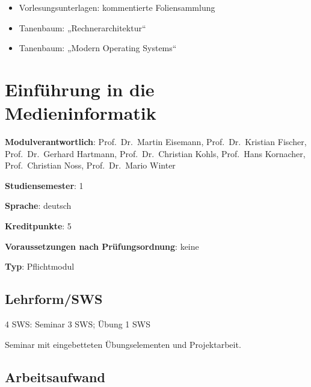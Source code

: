 \begin{itemize}
\tightlist
\item
  Vorlesungsunterlagen: kommentierte Foliensammlung
\item
  Tanenbaum: „Rechnerarchitektur``
\item
  Tanenbaum: „Modern Operating Systems``
\end{itemize}

\chapter{Einführung in die
Medieninformatik\label{/mi-2017/modulbeschreibungen-bachelor/BA_EinfhrungindieMedieninformatik}}\label{einfuxfchrung-in-die-medieninformatikpathlabelmi-2017modulbeschreibungen-bachelorbaux5feinfhrungindiemedieninformatik}

\begin{modulHead}
\textbf{Modulverantwortlich}: Prof.~Dr.~Martin
Eisemann, Prof.~Dr.~Kristian Fischer, Prof.~Dr.~Gerhard Hartmann,
Prof.~Dr.~Christian Kohls, Prof.~Hans Kornacher, Prof.~Christian Noss,
Prof.~Dr.~Mario
Winter
\end{modulHead}
\begin{modulHead}
\textbf{Studiensemester}:
1
\end{modulHead}
\begin{modulHead}
\textbf{Sprache}:
deutsch
\end{modulHead}
\begin{modulHead}
\textbf{Kreditpunkte}:
5
\end{modulHead}
\begin{modulHead}
\textbf{Voraussetzungen nach
Prüfungsordnung}: keine
\end{modulHead}
\begin{modulHead}
\textbf{Typ}:
Pflichtmodul
\end{modulHead}


\section*{Lehrform/SWS\label{/mi-2017/modulbeschreibungen-bachelor/BA_EinfhrungindieMedieninformatik}}\label{lehrformswspathlabelmi-2017modulbeschreibungen-bachelorbaux5feinfhrungindiemedieninformatik}

4 SWS: Seminar 3 SWS; Übung 1 SWS

Seminar mit eingebetteten Übungselementen und Projektarbeit.

\section*{Arbeitsaufwand\label{/mi-2017/modulbeschreibungen-bachelor/BA_EinfhrungindieMedieninformatik}}\label{arbeitsaufwandpathlabelmi-2017modulbeschreibungen-bachelorbaux5feinfhrungindiemedieninformatik}

